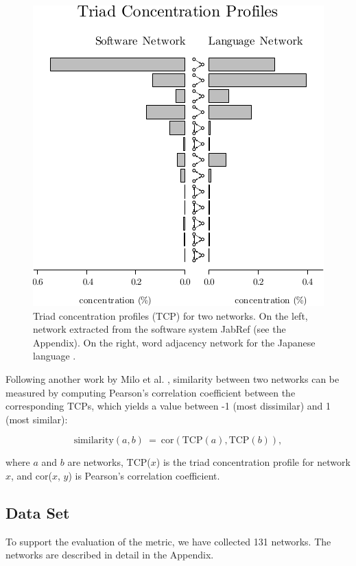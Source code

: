 \begin{figure}[!t]
\center
\includegraphics{tcp}
\caption{Triad concentration profiles (TCP) for two networks. On the left,
network extracted from the software system JabRef (see the Appendix). On the
right, word adjacency network for the Japanese language \cite{Milo2004}.}
\label{fig:profiles}
\end{figure}

Following another work by Milo et al. \cite{Milo2004}, similarity between two
networks can be measured by computing Pearson's correlation coefficient between
the corresponding TCPs, which yields a value between -1 (most dissimilar) and 1
(most similar):

$$
\mathrm{similarity}(a, b) ~=~ 
  \mathrm{cor}(\mathrm{TCP}(a), \mathrm{TCP}(b))\mathrm{,}
$$

where $a$ and $b$ are networks, TCP($x$) is the triad concentration profile for
network $x$, and cor($x$, $y$) is Pearson's correlation coefficient.

\subsection{Data Set}

To support the evaluation of the metric, we have collected 131 networks. The
networks are described in detail in the Appendix.

